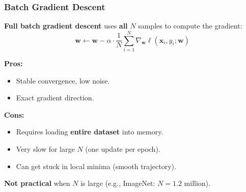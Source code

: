 \documentclass[notes,11pt, aspectratio=169]{beamer}
\newcommand{\vx}{\mathbf{x}}
\newcommand{\vw}{\mathbf{w}}
\begin{document}
\begin{frame}
\frametitle{Batch Gradient Descent}

\textbf{Full batch gradient descent} uses \textbf{all} $N$ samples to compute the gradient:
\[
    \vw \leftarrow \vw - \alpha \cdot \frac{1}{N}\sum_{i=1}^{N} \nabla_{\vw}\ell(\vx_i, y_i; \vw)
\]

\vspace{6pt}
\textbf{Pros:}
\begin{itemize}
    \item Stable convergence, low noise.
    \item Exact gradient direction.
\end{itemize}

\vspace{4pt}
\textbf{Cons:}
\begin{itemize}
    \item Requires loading \textbf{entire dataset} into memory.
    \item Very slow for large $N$ (one update per epoch).
    \item Can get stuck in local minima (smooth trajectory).
\end{itemize}

\vspace{6pt}
\textbf{Not practical} when $N$ is large (e.g., ImageNet: $N = 1.2$ million).
\end{frame}
\end{document}
